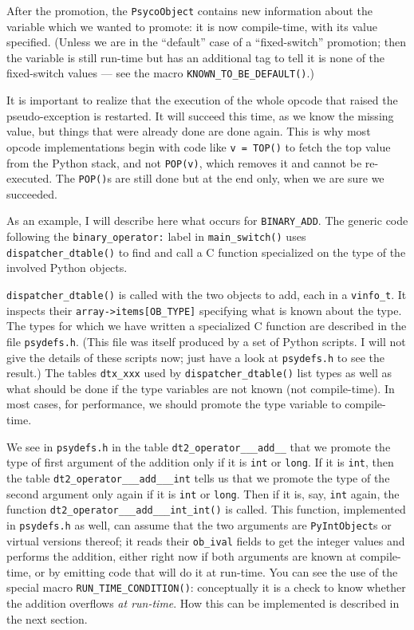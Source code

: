 \documentclass{article}
\def\code#1{\texttt{#1}}
\begin{document}
After the promotion, the \code{PsycoObject} contains new information about the variable which we wanted to promote: it is now compile-time, with its value specified. (Unless we are in the ``default'' case of a ``fixed-switch'' promotion; then the variable is still run-time but has an additional tag to tell it is none of the fixed-switch values --- see the macro \code{KNOWN_TO_BE_DEFAULT()}.)

It is important to realize that the execution of the whole opcode that raised the pseudo-exception is restarted. It will succeed this time, as we know the missing value, but things that were already done are done again. This is why most opcode implementations begin with code like \code{v = TOP()} to fetch the top value from the Python stack, and not \code{POP(v)}, which removes it and cannot be re-executed. The \code{POP()}s are still done but at the end only, when we are sure we succeeded.

\medskip

As an example, I will describe here what occurs for \code{BINARY_ADD}. The generic code following the \code{binary_operator:} label in \code{main_switch()} uses \code{dispatcher_dtable()} to find and call a C function specialized on the type of the involved Python objects.

\code{dispatcher_dtable()} is called with the two objects to add, each in a \code{vinfo_t}. It inspects their \code{array->items[OB_TYPE]} specifying what is known about the type. The types for which we have written a specialized C function are described in the file \code{psydefs.h}. (This file was itself produced by a set of Python scripts. I will not give the details of these scripts now; just have a look at \code{psydefs.h} to see the result.) The tables \code{dtx_xxx} used by \code{dispatcher_dtable()} list types as well as what should be done if the type variables are not known (not compile-time). In most cases, for performance, we should promote the type variable to compile-time.

We see in \code{psydefs.h} in the table \code{dt2_operator___add__} that we promote the type of first argument of the addition only if it is \code{int} or \code{long}. If it is \code{int}, then the table \code{dt2_operator___add___int} tells us that we promote the type of the second argument only again if it is \code{int} or \code{long}. Then if it is, say, \code{int} again, the function \code{dt2_operator___add___int_int()} is called. This function, implemented in \code{psydefs.h} as well, can assume that the two arguments are \code{PyIntObject}s or virtual versions thereof; it reads their \code{ob_ival} fields to get the integer values and performs the addition, either right now if both arguments are known at compile-time, or by emitting code that will do it at run-time. You can see the use of the special macro \code{RUN_TIME_CONDITION()}: conceptually it is a check to know whether the addition overflows \emph{at run-time}. How this can be implemented is described in the next section.
\end{document}
